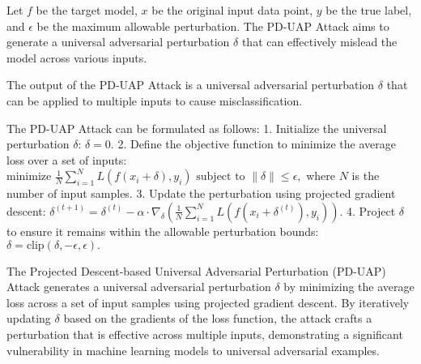 Let \( f \) be the target model, \( x \) be the original input data point, \( y \) be the true label, and \( \epsilon \) be the maximum allowable perturbation. The PD-UAP Attack aims to generate a universal adversarial perturbation \( \delta \) that can effectively mislead the model across various inputs.

The output of the PD-UAP Attack is a universal adversarial perturbation \( \delta \) that can be applied to multiple inputs to cause misclassification.

The PD-UAP Attack can be formulated as follows:
1. Initialize the universal perturbation \( \delta \):
   $
   \delta = 0.
   $
2. Define the objective function to minimize the average loss over a set of inputs:
   $
   \text{minimize } \frac{1}{N} \sum_{i=1}^{N} L(f(x_i + \delta), y_i) \text{ subject to } \|\delta\| \leq \epsilon,
   $
   where \( N \) is the number of input samples.
3. Update the perturbation using projected gradient descent:
   $
   \delta^{(t+1)} = \delta^{(t)} - \alpha \cdot \nabla_{\delta} \left( \frac{1}{N} \sum_{i=1}^{N} L(f(x_i + \delta^{(t)}), y_i) \right).
   $
4. Project \( \delta \) to ensure it remains within the allowable perturbation bounds:
   $
   \delta = \text{clip}(\delta, -\epsilon, \epsilon).
   $

The Projected Descent-based Universal Adversarial Perturbation (PD-UAP) Attack generates a universal adversarial perturbation \( \delta \) by minimizing the average loss across a set of input samples using projected gradient descent. By iteratively updating \( \delta \) based on the gradients of the loss function, the attack crafts a perturbation that is effective across multiple inputs, demonstrating a significant vulnerability in machine learning models to universal adversarial examples.
